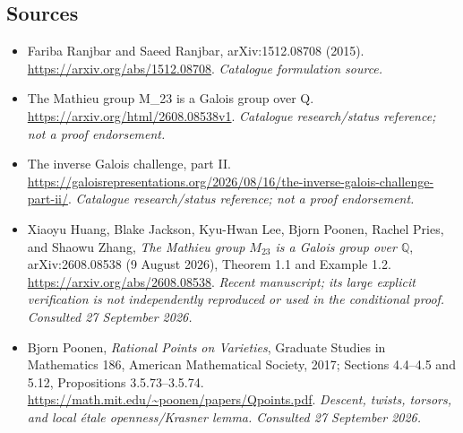 \documentclass[11pt,a4paper]{article}
\newcommand{\Q}{\mathbb{Q}}
\numberwithin{equation}{section}
\begin{document}
\subsection{Sources}
\begin{itemize}\raggedright
\item[\textnormal{[S1]}]\hypertarget{source:61:1}{} Fariba Ranjbar and Saeed Ranjbar, arXiv:1512.08708 (2015).
\url{https://arxiv.org/abs/1512.08708}.
{\small\textit{Catalogue formulation source.}}
\item[\textnormal{[S2]}]\hypertarget{source:61:2}{} The Mathieu group M\_23 is a Galois group over Q.
\url{https://arxiv.org/html/2608.08538v1}.
{\small\textit{Catalogue research/status reference; not a proof endorsement.}}
\item[\textnormal{[S3]}]\hypertarget{source:61:3}{} The inverse Galois challenge, part II.
\url{https://galoisrepresentations.org/2026/08/16/the-inverse-galois-challenge-part-ii/}.
{\small\textit{Catalogue research/status reference; not a proof endorsement.}}

\item[\textnormal{[E1]}]\hypertarget{extra:61:1}{} Xiaoyu Huang, Blake Jackson, Kyu-Hwan Lee, Bjorn Poonen, Rachel Pries, and Shaowu Zhang, \emph{The Mathieu group $M_{23}$ is a Galois group over $\Q$}, arXiv:2608.08538 (9 August 2026), Theorem 1.1 and Example 1.2.
\url{https://arxiv.org/abs/2608.08538}.
{\small\textit{Recent manuscript; its large explicit verification is not independently reproduced or used in the conditional proof. Consulted 27 September 2026.}}
\item[\textnormal{[E2]}]\hypertarget{extra:61:2}{} Bjorn Poonen, \emph{Rational Points on Varieties}, Graduate Studies in Mathematics 186, American Mathematical Society, 2017; Sections 4.4--4.5 and 5.12, Propositions 3.5.73--3.5.74.
\url{https://math.mit.edu/~poonen/papers/Qpoints.pdf}.
{\small\textit{Descent, twists, torsors, and local étale openness/Krasner lemma. Consulted 27 September 2026.}}
\end{itemize}
\end{document}
